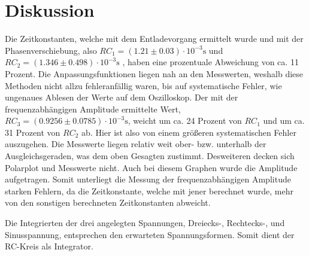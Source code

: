 \section{Diskussion}
\label{sec:Diskussion}


Die Zeitkonstanten, welche mit dem Entladevorgang ermittelt wurde und mit der Phasenverschiebung, also $RC_1 = (1.21 \pm 0.03)\cdot 10^{-3} \si{\second}$ 
und $RC_2 = (1.346 \pm 0.498) \cdot 10^{-3} \si{\second}$ , haben eine prozentuale Abweichung von ca. 11 Prozent. 
Die Anpassungsfunktionen liegen nah an den Messwerten, weshalb diese Methoden nicht allzu fehleranfällig waren, bis auf systematische Fehler,
wie ungenaues Ablesen der Werte auf dem Oszilloskop. Der mit der frequenzabhängigen Amplitude ermittelte Wert, $RC_3 = (0.9256\pm  0.0785)\cdot 10^{-3} \si{\second}$,
weicht um ca. 24 Prozent von $RC_1$ und um ca. 31 Prozent von $RC_2$ ab. Hier ist also von einem größeren systematischen Fehler auszugehen.
Die Messwerte liegen relativ weit ober- bzw. unterhalb der Ausgleichsgeraden, was dem oben Gesagten zustimmt. 
Desweiteren decken sich Polarplot und Messwerte nicht. Auch bei diesem Graphen wurde die Amplitude aufgetragen. Somit unterliegt 
die Messung der frequenzabhängigen Amplitude starken Fehlern, da die Zeitkonstante, welche mit jener berechnet wurde, mehr von den
sonstigen berechneten Zeitkonstanten abweicht.

\noindent Die Integrierten der drei angelegten Spannungen, Dreiecks-, Rechtecks-, und Sinusspannung, entsprechen den erwarteten Spannungsformen.
Somit dient der RC-Kreis als Integrator.